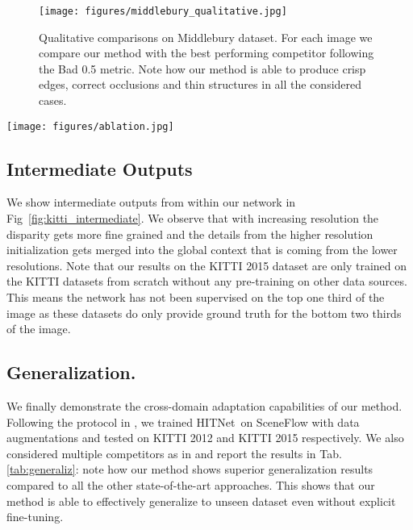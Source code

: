 \documentclass[final]{cvpr}
\newcommand{\algoname}{HITNet}
\begin{document}
\begin{figure}[t]
    \centering
    \texttt{[image: figures/middlebury\_qualitative.jpg]}
    \caption{Qualitative comparisons on Middlebury dataset. For each image we compare our method with the best performing competitor following the Bad 0.5 metric. Note how our method is able to produce crisp edges, correct occlusions and thin structures in all the considered cases.}
    \label{fig:middlebury_qualitative}
    \vspace{-20pt}
\end{figure}

\begin{figure*}[htb]
    \centering
    \texttt{[image: figures/ablation.jpg]}
    \caption{Ablation study, qualitative evaluation. Note how our \algoname \ model relies on all proposed design choices in order to achieve the best results on fine details, edges and occluded regions.
   }
    \label{fig:ablation}
\end{figure*}

\subsection{Intermediate Outputs}

We show intermediate outputs from within our network in Fig~\ref{fig:kitti_intermediate}. We observe that with increasing resolution the disparity gets more fine grained and the details from the higher resolution initialization gets merged into the global context that is coming from the lower resolutions. 
Note that our results on the KITTI 2015 dataset are only trained on the KITTI datasets from scratch without any pre-training on other data sources. This means the network has not been supervised on the top one third of the image as these datasets do only provide ground truth for the bottom two thirds of the image.

\subsection{Generalization.} We finally demonstrate the cross-domain adaptation capabilities of our method. Following the protocol in \cite{song2020edgestereo}, we trained \algoname \ on SceneFlow with data augmentations and tested on KITTI 2012 and KITTI 2015 respectively. We also considered multiple competitors as in \cite{song2020edgestereo} and report the results in Tab. \ref{tab:generaliz}: note how our method shows superior generalization results compared to all the other state-of-the-art approaches. This shows that our method is able to effectively generalize to unseen dataset even without explicit fine-tuning.
\end{document}
